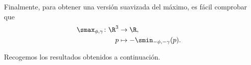 Finalmente, para obtener una versión suavizada del máximo, es fácil comprobar que 
\begin{align*}
      \smax_{\phi,\gamma}\colon \R^3&\to \R,\\
      p &\mapsto -\smin_{-\phi,-\gamma}(p).
\end{align*}

Recogemos los resultados obtenidos a continuación.









